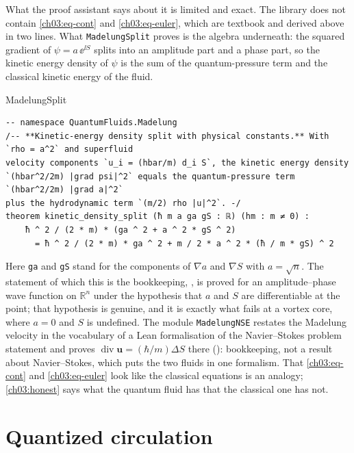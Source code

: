 What the proof assistant says about it is limited and exact. The library does not contain \eqref{ch03:eq-cont} and \eqref{ch03:eq-euler}, which are textbook and derived above in two lines. What \texttt{MadelungSplit} proves is the algebra underneath: the squared gradient of $\psi=a\,\ee^{\ii S}$ splits into an amplitude part and a phase part, so the kinetic energy density of $\psi$ is the sum of the quantum-pressure term and the classical kinetic energy of the fluid.

\begin{leanbox}{MadelungSplit}
\begin{lstlisting}[style=lean,basicstyle=\ttfamily\footnotesize]
-- namespace QuantumFluids.Madelung
/-- **Kinetic-energy density split with physical constants.** With `rho = a^2` and superfluid
velocity components `u_i = (hbar/m) d_i S`, the kinetic energy density
`(hbar^2/2m) |grad psi|^2` equals the quantum-pressure term `(hbar^2/2m) |grad a|^2`
plus the hydrodynamic term `(m/2) rho |u|^2`. -/
theorem kinetic_density_split (ħ m a ga gS : ℝ) (hm : m ≠ 0) :
    ħ ^ 2 / (2 * m) * (ga ^ 2 + a ^ 2 * gS ^ 2)
      = ħ ^ 2 / (2 * m) * ga ^ 2 + m / 2 * a ^ 2 * (ħ / m * gS) ^ 2
\end{lstlisting}
\end{leanbox}

Here \texttt{ga} and \texttt{gS} stand for the components of $\nabla a$ and $\nabla S$ with $a=\sqrt n$. The statement of which this is the bookkeeping, , is proved for an amplitude--phase wave function on $\mathbb R^n$ under the hypothesis that $a$ and $S$ are differentiable at the point; that hypothesis is genuine, and it is exactly what fails at a vortex core, where $a=0$ and $S$ is undefined. The module \texttt{MadelungNSE} restates the Madelung velocity in the vocabulary of a Lean formalisation of the Navier--Stokes problem statement and proves $\operatorname{div}\mathbf u=(\hbar/m)\Delta S$ there (): bookkeeping, not a result about Navier--Stokes, which puts the two fluids in one formalism. That \eqref{ch03:eq-cont} and \eqref{ch03:eq-euler} look like the classical equations is an analogy; \cref{ch03:honest} says what the quantum fluid has that the classical one has not.

\section{Quantized circulation}\label{ch03:circ}


